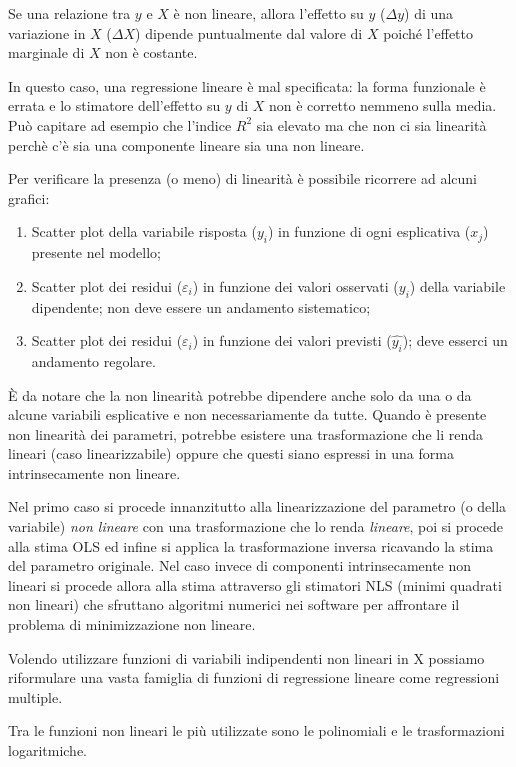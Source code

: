 \documentclass[a4page, 11pt]{article} %
\begin{document}
Se una relazione tra $y$ e $X$ è non lineare, allora l’effetto su $y$ ($\Delta y$)  di una variazione in $X$ ($\Delta X$) dipende puntualmente dal valore di $X$ poiché l’effetto marginale di $X$ non è costante. 

In questo caso, una regressione lineare è mal specificata: la forma funzionale è errata e lo stimatore dell’effetto su $y$ di $X$ non è corretto nemmeno sulla media. 
Può capitare ad esempio che l'indice $R^{2}$ sia elevato ma che non ci sia linearità perchè c'è sia una componente lineare sia una non lineare. 

Per verificare la presenza (o meno) di linearità è possibile ricorrere ad alcuni grafici: 
\begin{enumerate}[noitemsep]
\item Scatter plot della  variabile risposta ($y_i$) in funzione di ogni esplicativa ($x_j$) presente nel modello;
\item Scatter plot dei residui ($\varepsilon_i$) in funzione dei valori osservati ($y_i$) della variabile dipendente; non deve essere un andamento sistematico;
\item Scatter plot dei residui ($\varepsilon_i$) in funzione dei valori previsti ($\hat{y_i}$); deve esserci un andamento regolare.
\end{enumerate}
È da notare che la non linearità potrebbe dipendere anche solo da una o da alcune variabili esplicative e non necessariamente da tutte.
Quando è presente non linearità dei parametri, potrebbe esistere una trasformazione che li renda lineari (caso linearizzabile) oppure che questi siano espressi in una forma intrinsecamente non lineare.

Nel primo caso si procede innanzitutto alla linearizzazione del parametro (o della variabile) \textit{non lineare} con una trasformazione che lo renda \textit{lineare}, poi si procede alla stima OLS ed infine si applica la trasformazione inversa ricavando la stima del parametro originale. 
Nel caso invece di componenti intrinsecamente non lineari si procede allora alla stima attraverso gli stimatori NLS (minimi quadrati non lineari) che sfruttano algoritmi numerici nei software per affrontare il problema di minimizzazione non lineare.

Volendo utilizzare funzioni di variabili indipendenti non lineari in X possiamo riformulare una vasta famiglia di funzioni di regressione lineare come regressioni multiple.

Tra le funzioni non lineari le più utilizzate sono le polinomiali e le trasformazioni logaritmiche. 
\end{document}

